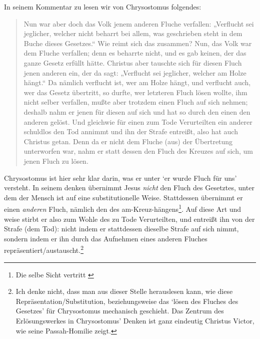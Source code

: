 In seinem Kommentar zu  lesen wir von Chrysostomus folgendes:
\begin{quote}
Nun war aber doch das Volk jenem anderen Fluche verfallen: „Verflucht sei jeglicher, welcher nicht beharrt bei allem, was geschrieben steht in dem Buche dieses Gesetzes.“
Wie reimt sich das zusammen?
Nun, das Volk war dem Fluche verfallen; denn es beharrte nicht, und es gab keinen, der das ganze Gesetz erfüllt hätte.
Christus aber tauschte sich für diesen Fluch jenen anderen ein, der da sagt: „Verflucht sei jeglicher, welcher am Holze hängt.“
Da nämlich verflucht ist, wer am Holze hängt, und verflucht auch, wer das Gesetz übertritt, so durfte, wer letzteren Fluch lösen wollte, ihm nicht selber verfallen, mußte aber trotzdem einen Fluch auf sich nehmen; deshalb nahm er jenen für diesen auf sich und hat so durch den einen den anderen gelöst.
Und gleichwie für einen zum Tode Verurteilten ein anderer schuldlos den Tod annimmt und ihn der Strafe entreißt, also hat auch Christus getan.
Denn da er nicht dem Fluche (aus) der Übertretung unterworfen war, nahm er statt dessen den Fluch des Kreuzes auf sich, um jenen Fluch zu lösen.
\end{quote}
Chrysostomus ist hier sehr klar darin, was er unter `er wurde Fluch für uns' versteht.
In seinem denken übernimmt Jesus \textit{nicht} den Fluch des Gesetztes, unter dem der Mensch ist auf eine substitutionelle Weise.
Stattdessen übernimmt er einen \textit{anderen} Fluch, nämlich den des am-Kreuz-hängens\footnote{Die selbe Sicht vertritt \Cite[237f]{paul-and-the-law-in-chrysostom}}.
Auf diese Art und weise stirbt er also zum Wohle des zu Tode Verurteilten, und entreißt ihn von der Strafe (dem Tod): nicht indem er stattdessen dieselbe Strafe auf sich nimmt,
sondern indem er ihn durch das Aufnehmen eines anderen Fluches repräsentiert/austauscht.\footnote{
Ich denke nicht, dass man aus dieser Stelle herauslesen kann, wie diese Repräsentation/Substitution, beziehungsweise das `lösen des Fluches des Gesetzes' für Chrysostomus mechanisch geschieht.
Das Zentrum des Erlösungswerkes in Chrysostomus' Denken ist ganz eindeutig Christus Victor, wie seine Passah-Homilie zeigt.}

